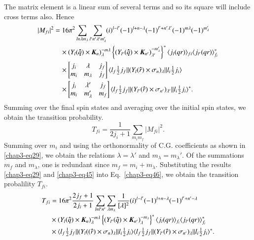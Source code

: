 The matrix element is a linear sum of several terms and so its square will include cross terms also. Hence
\begin{align}
  |M_{fi}|^2 & = 16\pi^2 \sum_{ln\lambda m_\lambda} \sum_{l' n' \lambda' m_\lambda '} (i)^{l-l'} (-1)^{l + n - \lambda} (-1)^{l' + n' \lambda'} (-1)^{m\lambda} (-1)^{m_\lambda'} \notag \\
  &  \quad \times (Y_l ({\boldsymbol \hat{q}}) \times {\boldsymbol K}_n)_\lambda^{-m\lambda}  \left\{ (Y_{l'} ({\boldsymbol \hat{q}}) \times {\boldsymbol K}_{n'})_{\lambda'}^{-m_\lambda'}\right\}^\ast \langle j_l (qr)\rangle_{fi} \langle j_{l'}(qr)\rangle^\ast_{f_i} \notag \\
  & \quad \times \begin{bmatrix} j_i & \lambda & j_f\\ m_i & m_\lambda & j_f \end{bmatrix}
  \langle l_f \tfrac{1}{2} j_f || (Y_l ({\boldsymbol \hat{r}}) \times \sigma_n)_\lambda || l_i \tfrac{1}{2} j_i \rangle \notag \\
  & \quad \times \begin{bmatrix} j_i & \lambda' & j_f\\ m_i & m_\lambda' & m_f \end{bmatrix}
  \langle l_f \tfrac{1}{2} j_f || (Y_{l'} ({\boldsymbol \hat{r}}) \times \sigma_{n'})_{\lambda'} || l_i \tfrac{1}{2} j_i \rangle^\ast. \label{chap3-eq45}
\end{align}
Summing over the final spin states and averaging over the initial spin states, we obtain the transition probability.
\begin{equation}
  T_{fi} = \frac{1}{2j_i +1} \sum_{m_i m_f} |M_{fi}|^2. \label{chap3-eq46}
\end{equation}
Summing over $m_i$ and using the orthonormality of C.G. coefficients as shown in \eqref{chap3-eq29}, we obtain the relations $\lambda = \lambda'$ and $m_\lambda= m_\lambda'$. Of the summations $m_f$ and $m_\lambda$, one is redundant since $m_f= m_i+ m_\lambda$. Substituting the results \eqref{chap3-eq29} and \eqref{chap3-eq45} into Eq.\ \eqref{chap3-eq46}, we obtain the transition probalility $T_{fi}$.
\begin{align}
  T_{fi} & = 16\pi^2 \frac{2j_f +1}{2j_i+1} \sum_{lnl'n'} \sum_{\lambda m_\lambda} \frac{1}{[\lambda]^2} (i)^{l-l'} (-1)^{l+ n - \lambda} (-1)^{l' + n'-\lambda}\notag \\
  &  \times (Y_l ({\boldsymbol \hat{q}}) \times {\boldsymbol K}_n)^{-m\lambda}_\lambda \left\{ (Y_{l'}({\boldsymbol \hat{q}}) \times {\boldsymbol K}_{n'})_\lambda^{-m_\lambda}\right\}^\ast \langle j_l (qr)\rangle_{f_i} \langle j_{l'}(qr)\rangle_{f_i}^\ast \notag \\
  &  \times \langle l_f \tfrac{1}{2} j_f || (Y_l (({\boldsymbol \hat{r}}) \times \sigma_n)_\lambda || l_i \tfrac{1}{2}j_i \rangle \langle l_f \tfrac{1}{2} j_f  || (Y_{l'} ({\boldsymbol \hat{r}}) \times \sigma_{n'})_\lambda || l_i \tfrac{1}{2} j_i \rangle^\ast. \label{chap3-eq47}
\end{align}

